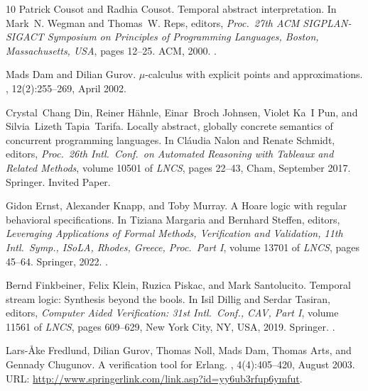 \documentclass[10pt,a4paper]{amsart}
\theoremstyle{definition}
\begin{document}
\begin{thebibliography}{10}
Patrick Cousot and Radhia Cousot.
\newblock Temporal abstract interpretation.
\newblock In Mark~N. Wegman and Thomas~W. Reps, editors, {\em Proc.\ 27th {ACM}
  {SIGPLAN-SIGACT} Symposium on Principles of Programming Languages, Boston,
  Massachusetts, USA}, pages 12--25. {ACM}, 2000.
\newblock \href {https://doi.org/10.1145/325694.325699}
  {}.

Mads Dam and Dilian Gurov.
\newblock $\mu$-calculus with explicit points and approximations.
, 12(2):255--269, April 2002.

Crystal~Chang Din, Reiner H{\"a}hnle, Einar~Broch Johnsen, Violet Ka~I Pun, and
  Silvia~Lizeth Tapia~Tarifa.
\newblock Locally abstract, globally concrete semantics of concurrent
  programming languages.
\newblock In Cl{\'a}udia Nalon and Renate Schmidt, editors, {\em Proc.\ 26th
  Intl.\ Conf.\ on Automated Reasoning with Tableaux and Related Methods},
  volume 10501 of {\em LNCS}, pages 22--43, Cham, September 2017. Springer.
\newblock Invited Paper.

Gidon Ernst, Alexander Knapp, and Toby Murray.
\newblock A {Hoare} logic with regular behavioral specifications.
\newblock In Tiziana Margaria and Bernhard Steffen, editors, {\em Leveraging
  Applications of Formal Methods, Verification and Validation, 11th Intl.\
  Symp., ISoLA, Rhodes, Greece, Proc.\ Part {I}}, volume 13701 of {\em LNCS},
  pages 45--64. Springer, 2022.
\newblock \href {https://doi.org/10.1007/978-3-031-19849-6\_4}
  {}.

Bernd Finkbeiner, Felix Klein, Ruzica Piskac, and Mark Santolucito.
\newblock Temporal stream logic: Synthesis beyond the bools.
\newblock In Isil Dillig and Serdar Tasiran, editors, {\em Computer Aided
  Verification: 31st Intl.\ Conf., {CAV}, Part {I}}, volume 11561 of {\em
  LNCS}, pages 609--629, New York City, NY, USA, 2019. Springer.
\newblock \href {https://doi.org/10.1007/978-3-030-25540-4\_35}
  {}.

Lars-{\AA{}}ke Fredlund, Dilian Gurov, Thomas Noll, Mads Dam, Thomas Arts, and
  Gennady Chugunov.
\newblock A verification tool for {E}rlang.
,
  4(4):405--420, August 2003.
\newblock URL: \url{http://www.springerlink.com/link.asp?id=yy6ub3rfup6ymfut}.


\end{thebibliography}
\end{document}
